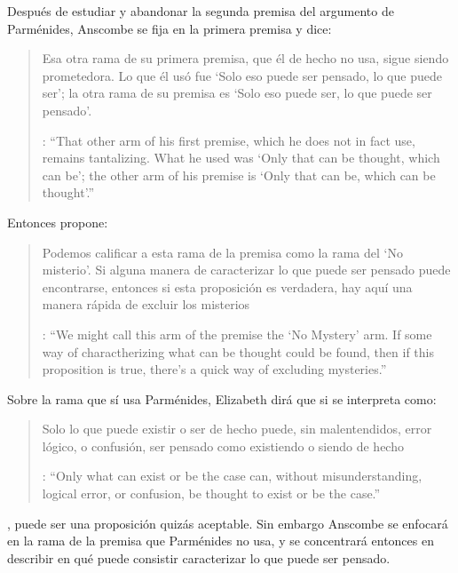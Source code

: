 Después de estudiar y abandonar la segunda premisa del argumento de Parménides, Anscombe se fija en la primera premisa y dice: \blockquote[{\cite[5]{anscombe1981parmenides:pmc}}: \enquote{That other arm of his first premise, which he does not in fact use, remains tantalizing. What he used was `Only that can be thought, which can be'; the other arm of his premise is `Only that can be, which can be thought'.}]{Esa otra rama de su primera premisa, que él de hecho no usa, sigue siendo prometedora. Lo que él usó fue `Solo eso puede ser pensado, lo que puede ser'; la otra rama de su premisa es `Solo eso puede ser, lo que puede ser pensado'.} Entonces propone: \blockquote[{\cite[5]{anscombe1981parmenides:pmc}}: \enquote{We might call this arm of the premise the `No Mystery' arm. If some way of charactherizing what can be thought could be found, then if this proposition is true, there's a quick way of excluding mysteries.}]{Podemos calificar a esta rama de la premisa como la rama del `No misterio'. Si alguna manera de caracterizar lo que puede ser pensado puede encontrarse, entonces si esta proposición es verdadera, hay aquí una manera rápida de excluir los misterios}. Sobre la rama que sí usa Parménides, Elizabeth dirá que si se interpreta como: \blockquote[{\cite[6]{anscombe1981parmenides:pmc}}: \enquote{Only what can exist or be the case can, without misunderstanding, logical error, or confusion, be thought to exist or be the case.}]{Solo lo que puede existir o ser de hecho puede, sin malentendidos, error lógico, o confusión, ser pensado como existiendo o siendo de hecho}, puede ser una proposición quizás aceptable. Sin embargo Anscombe se enfocará en la rama de la premisa que Parménides no usa, y se concentrará entonces en describir en qué puede consistir caracterizar lo que puede ser pensado.

